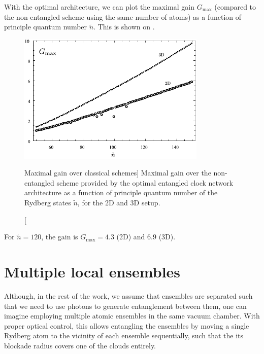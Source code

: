 With the optimal architecture, we can plot the maximal gain $G_\mathrm{max}$
(compared to the non-entangled scheme using the same number of atoms) as a
function of principle quantum number $\tilde n$.
This is shown on .
\begin{figure}[h]
\centering
\includegraphics[width=0.8\textwidth]{./figs_Komar2015/gain_2d3d.pdf}
\caption
[Maximal gain over classical schemes]
{
\label{fig:gain}
Maximal gain over the non-entangled scheme provided by the optimal entangled
clock network architecture as a function of principle quantum number of the
Rydberg states $\tilde n$, for the 2D and 3D setup.}
\end{figure}
For $\tilde n = 120$, the gain is $G_\mathrm{max} = 4.3$ (2D) and $6.9$ (3D).


\section{Multiple local ensembles}
\label{app:Multiple_local_ensembles}
Although, in the rest of the work, we assume that ensembles are separated such
that we need to use photons to generate entanglement between them, one can
imagine employing multiple atomic ensembles in the same vacuum chamber. With
proper optical control, this allows entangling the ensembles by moving a single
Rydberg atom to the vicinity of each ensemble sequentially, such that the its
blockade radius covers one of the clouds entirely.

